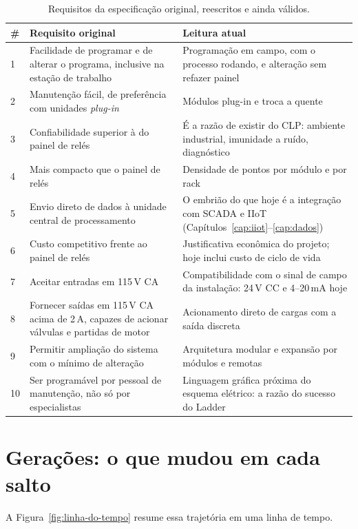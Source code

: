 \begin{table}[H]
  \centering
  \caption{Requisitos da especificação original, reescritos e ainda válidos.}
  \label{tab:requisitos-originais}
  \begin{tabular}{p{0.9cm} p{6.0cm} p{7.4cm}}
    \toprule
    \# & Requisito original & Leitura atual \\
    \midrule
    1 & Facilidade de programar e de alterar o programa, inclusive na estação de trabalho
      & Programação em campo, com o processo rodando, e alteração sem refazer painel \\
    2 & Manutenção fácil, de preferência com unidades \emph{plug-in}
      & Módulos plug-in e troca a quente \\
    3 & Confiabilidade superior à do painel de relés
      & É a razão de existir do CLP: ambiente industrial, imunidade a ruído, diagnóstico \\
    4 & Mais compacto que o painel de relés
      & Densidade de pontos por módulo e por rack \\
    5 & Envio direto de dados à unidade central de processamento
      & O embrião do que hoje é a integração com SCADA e IIoT (Capítulos~\ref{cap:iiot}--\ref{cap:dados}) \\
    6 & Custo competitivo frente ao painel de relés
      & Justificativa econômica do projeto; hoje inclui custo de ciclo de vida \\
    7 & Aceitar entradas em 115\,V CA
      & Compatibilidade com o sinal de campo da instalação: 24\,V CC e 4--20\,mA hoje \\
    8 & Fornecer saídas em 115\,V CA acima de 2\,A, capazes de acionar válvulas e partidas de motor
      & Acionamento direto de cargas com a saída discreta \\
    9 & Permitir ampliação do sistema com o mínimo de alteração
      & Arquitetura modular e expansão por módulos e remotas \\
    10 & Ser programável por pessoal de manutenção, não só por especialistas
      & Linguagem gráfica próxima do esquema elétrico: a razão do sucesso do Ladder \\
    \bottomrule
  \end{tabular}
\end{table}

\section{Gerações: o que mudou em cada salto} A Figura~\ref{fig:linha-do-tempo} resume essa trajetória em uma linha de tempo.

